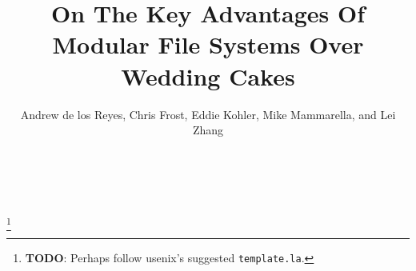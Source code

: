 \documentclass[10pt,twocolumn,letterpaper]{article}
\newcommand{\todo}[1]{\footnote{\textbf{TODO}: #1}}
\begin{document}
\normalsize

\title{\sffamily\textbf{On The Key Advantages Of Modular File Systems Over Wedding Cakes}}


\author{\sffamily Andrew de los Reyes, Chris Frost, Eddie Kohler, Mike
Mammarella, and Lei Zhang \\
\noalign{\vskip2pt}
 \\
\noalign{\vskip2pt}
 \\
\noalign{\vskip-.25in}
\null}
\date{}
\maketitle

\def\assast{\raise.2ex\hbox{$^\ast$}}


\todo{Perhaps follow usenix's suggested \texttt{template.la}.}



\end{document}
